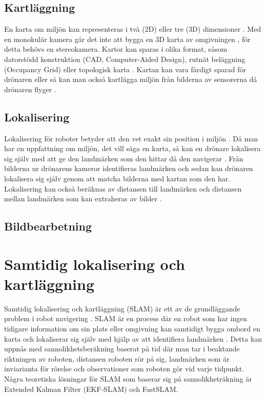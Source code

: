 \section{Kartläggning}

En karta om miljön kan representeras i två (2D) eller tre (3D) dimensioner \citep{geospatial}. Med en monokulär kamera går det inte att bygga en 3D karta av omgivningen \citep{depthmap}, för detta behövs en stereokamera. Kartor kan sparas i olika format, såsom datorstödd konstruktion (CAD, Computer-Aided Design), rutnät beläggning (Occupancy Grid) eller topologisk karta \citep{982903}. Kartan kan vara färdigt sparad för drönaren eller så kan man också kartlägga miljön från bilderna av sensorerna då drönaren flyger \citep{geospatial}. 

\section{Lokalisering}

Lokalisering för roboter betyder att den vet exakt sin position i miljön \citep{982903}. Då man har en uppfattning om miljön, det vill säga en karta, så kan en drönare lokalisera sig själv med att ge den landmärken som den hittar då den navigerar \citep{982903}. Från bilderna ur drönarens kameror identifieras landmärken och sedan kan drönaren lokalisera sig själv genom att matcha bilderna med kartan som den har. Lokalisering kan också beräknas av distansen till landmärken och distansen mellan landmärken som kan extraheras av bilder \citep{realslamproblem}.

\section{Bildbearbetning}


\chapter{Samtidig lokalisering och kartläggning}

Samtidig lokalisering och kartläggning (SLAM) är ett av de grundläggande problem i robot navigering \citep{realslamproblem}. SLAM är en process där en robot som har ingen tidigare information om sin plats eller omgivning kan samtidigt bygga ombord en karta och lokaliserar sig själv med hjälp av att identifiera landmärken \citep{realslamproblem}. Detta kan uppnås med sannolikhetsberäkning baserat på tid där man tar i beaktande riktningen av roboten, distansen roboten rör på sig, landmärken som är inviarianta för rörelse och observationer som roboten gör vid varje tidpunkt. Några teoretiska lösningar för SLAM som baserar sig på sannolikheträkning är Extended Kalman Filter (EKF-SLAM) och FastSLAM. 


